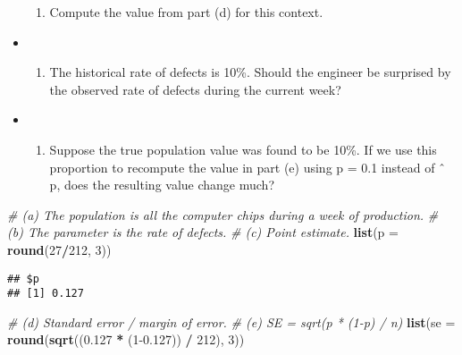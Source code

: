 \documentclass[]{book}
\newenvironment{Shaded}{\begin{snugshade}}{\end{snugshade}}
\newcommand{\CommentTok}[1]{\textcolor[rgb]{0.56,0.35,0.01}{\textit{#1}}}
\newcommand{\DataTypeTok}[1]{\textcolor[rgb]{0.13,0.29,0.53}{#1}}
\newcommand{\DecValTok}[1]{\textcolor[rgb]{0.00,0.00,0.81}{#1}}
\newcommand{\FloatTok}[1]{\textcolor[rgb]{0.00,0.00,0.81}{#1}}
\newcommand{\KeywordTok}[1]{\textcolor[rgb]{0.13,0.29,0.53}{\textbf{#1}}}
\newcommand{\NormalTok}[1]{#1}
\newcommand{\OperatorTok}[1]{\textcolor[rgb]{0.81,0.36,0.00}{\textbf{#1}}}
\newcommand{\StringTok}[1]{\textcolor[rgb]{0.31,0.60,0.02}{#1}}
\providecommand{\tightlist}{%
  \setlength{\itemsep}{0pt}\setlength{\parskip}{0pt}}
\begin{document}
\begin{itemize}
\begin{enumerate}
  \item
    Compute the value from part (d) for this context.
  \end{enumerate}
\item
  \begin{enumerate}
  \def\labelenumi{(\alph{enumi})}
  \setcounter{enumi}{5}
  \tightlist
  \item
    The historical rate of defects is 10\%. Should the engineer be surprised by the observed rate of defects during the current week?
  \end{enumerate}
\item
  \begin{enumerate}
  \def\labelenumi{(\alph{enumi})}
  \setcounter{enumi}{6}
  \tightlist
  \item
    Suppose the true population value was found to be 10\%. If we use this proportion to recompute the value in part (e) using p = 0.1 instead of ˆ p, does the resulting value change much?
  \end{enumerate}
\end{itemize}

\begin{Shaded}
\begin{Highlighting}[]
\CommentTok{# (a) The population is all the computer chips during a week of production.}
\CommentTok{# (b) The parameter is the rate of defects.}
\CommentTok{# (c) Point estimate.}
\KeywordTok{list}\NormalTok{(}\DataTypeTok{p =} \KeywordTok{round}\NormalTok{(}\DecValTok{27}\OperatorTok{/}\DecValTok{212}\NormalTok{, }\DecValTok{3}\NormalTok{))}
\end{Highlighting}
\end{Shaded}

\begin{verbatim}
## $p
## [1] 0.127
\end{verbatim}

\begin{Shaded}
\begin{Highlighting}[]
\CommentTok{# (d) Standard error / margin of error.}
\CommentTok{# (e) SE = sqrt(p * (1-p) / n)}
\KeywordTok{list}\NormalTok{(}\DataTypeTok{se =} \KeywordTok{round}\NormalTok{(}\KeywordTok{sqrt}\NormalTok{((}\FloatTok{0.127} \OperatorTok{*}\StringTok{ }\NormalTok{(}\DecValTok{1}\FloatTok{-0.127}\NormalTok{)) }\OperatorTok{/}\StringTok{ }\DecValTok{212}\NormalTok{), }\DecValTok{3}\NormalTok{))}
\end{Highlighting}
\end{Shaded}
\end{document}
